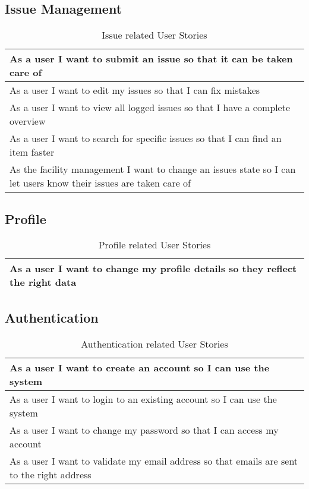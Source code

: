\subsection{Issue Management}
\begin{table}[H]
  \begin{tabularx}{\linewidth}{|X|}
    \hline
      As a user I want to submit an issue so that it can be taken care of \\
     \hline
      As a user I want to edit my issues so that I can fix mistakes \\
     \hline
      As a user I want to view all logged issues so that I have a complete overview \\
     \hline
      As a user I want to search for specific issues so that I can find an item faster \\
     \hline
      As the facility management I want to change an issues state so I can let users know their issues are taken care of \\
     \hline  
  \end{tabularx}
  \caption{Issue related User Stories}
\end{table}

\subsection{Profile}
\begin{table}[H]
  \begin{tabularx}{\linewidth}{|X|}
    \hline
      As a user I want to change my profile details so they reflect the right data \\
     \hline 
  \end{tabularx}
  \caption{Profile related User Stories}
\end{table}

\subsection{Authentication}
\begin{table}[H]
  \begin{tabularx}{\linewidth}{|X|}
    \hline
      As a user I want to create an account so I can use the system \\
     \hline
      As a user I want to login to an existing account so I can use the system \\
     \hline
      As a user I want to change my password so that I can access my account \\
     \hline
      As a user I want to validate my email address so that emails are sent to the right address \\
     \hline 
  \end{tabularx}
  \caption{Authentication related User Stories}
\end{table}

